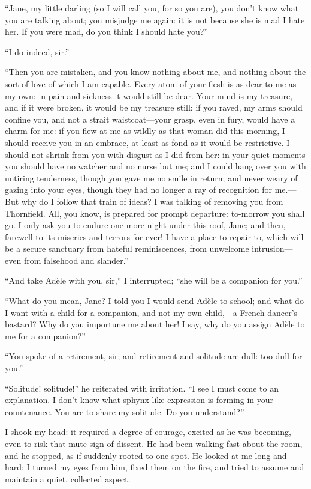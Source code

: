 \enquote{Jane, my little darling (so I will call you, for so you are),
	you don't know what you are talking about; you misjudge me again: it is
	not because she is mad I hate her. If you were mad, do you think I
	should hate you?}

\enquote{I do indeed, sir.}

\enquote{Then you are mistaken, and you know nothing about me, and
	nothing about the sort of love of which I am capable. Every atom of
	your flesh is as dear to me as my own: in pain and sickness it would
	still be dear. Your mind is my treasure, and if it were broken, it
	would be my treasure still: if you raved, my arms should confine you,
	and not a strait waistcoat---your grasp, even in fury, would have a
	charm for me: if you flew at me as wildly as that woman did this
	morning, I should receive you in an embrace, at least as fond as it
	would be restrictive. I should not shrink from you with disgust as I
	did from her: in your quiet moments you should have no watcher and no
	nurse but me; and I could hang over you with untiring tenderness, though
	you gave me no smile in return; and never weary of gazing into your
	eyes, though they had no longer a ray of recognition for me.---But why
	do I follow that train of ideas? I was talking of removing you from
	Thornfield. All, you know, is prepared for prompt departure: to-morrow
	you shall go. I only ask you to endure one more night under this roof,
	Jane; and then, farewell to its miseries and terrors for ever! I have a
	place to repair to, which will be a secure sanctuary from hateful
	reminiscences, from unwelcome intrusion---even from falsehood and
	slander.}

\enquote{And take Adèle with you, sir,} I interrupted; \enquote{she will
	be a companion for you.}

\enquote{What do you mean, Jane? I told you I would send Adèle to
	school; and what do I want with a child for a companion, and not my own
	child,---a French dancer's bastard? Why do you importune me about her!
	I say, why do you assign Adèle to me for a companion?}

\enquote{You spoke of a retirement, sir; and retirement and solitude are
	dull: too dull for you.}

\enquote{Solitude! solitude!} he reiterated with irritation. \enquote{I
	see I must come to an explanation. I don't know what sphynx-like
	expression is forming in your countenance. You are to share my
	solitude. Do you understand?}

I shook my head: it required a degree of courage, excited as he was
becoming, even to risk that mute sign of dissent. He had been walking
fast about the room, and he stopped, as if suddenly rooted to one spot.
He looked at me long and hard: I turned my eyes from him, fixed them on
the fire, and tried to assume and maintain a quiet, collected aspect.

